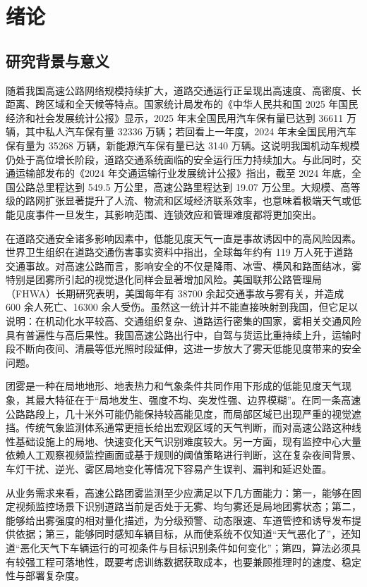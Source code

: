 \chapter{绪论}

\section{研究背景与意义}

随着我国高速公路网络规模持续扩大，道路交通运行正呈现出高速度、高密度、长距离、跨区域和全天候等特点。国家统计局发布的《中华人民共和国 2025 年国民经济和社会发展统计公报》显示，2025 年末全国民用汽车保有量已达到 36611 万辆，其中私人汽车保有量 32336 万辆；若回看上一年度，2024 年末全国民用汽车保有量为 35268 万辆，新能源汽车保有量已达 3140 万辆\cite{stat2025,stat2024}。这说明我国机动车规模仍处于高位增长阶段，道路交通系统面临的安全运行压力持续加大。与此同时，交通运输部发布的《2024 年交通运输行业发展统计公报》指出，截至 2024 年底，全国公路总里程达到 549.5 万公里，高速公路里程达到 19.07 万公里\cite{mot2024report}。大规模、高等级的路网扩张显著提升了人流、物流和区域经济联系效率，也意味着极端天气或低能见度事件一旦发生，其影响范围、连锁效应和管理难度都将更加突出。

在道路交通安全诸多影响因素中，低能见度天气一直是事故诱因中的高风险因素。世界卫生组织在道路交通伤害事实资料中指出，全球每年约有 119 万人死于道路交通事故。对高速公路而言，影响安全的不仅是降雨、冰雪、横风和路面结冰，雾特别是团雾所引起的视觉退化同样会显著增加风险。美国联邦公路管理局（FHWA）长期研究表明，美国每年有 38700 余起交通事故与雾有关，并造成 600 余人死亡、16300 余人受伤\cite{whoRoadInjury,fhwaWeatherImpact,aaafogreport2026}。虽然这一统计并不能直接映射到我国，但它足以说明：在机动化水平较高、交通组织复杂、道路运行密集的国家，雾相关交通风险具有普遍性与高后果性。我国高速公路出行中，自驾与货运比重持续上升，运输时段不断向夜间、清晨等低光照时段延伸，这进一步放大了雾天低能见度带来的安全问题。

团雾是一种在局地地形、地表热力和气象条件共同作用下形成的低能见度天气现象，其最大特征在于“局地发生、强度不均、突发性强、边界模糊”。在同一条高速公路路段上，几十米外可能仍能保持较高能见度，而局部区域已出现严重的视觉遮挡。传统气象监测体系通常更擅长给出宏观区域的天气判断，而对高速公路这种线性基础设施上的局地、快速变化天气识别难度较大。另一方面，现有监控中心大量依赖人工观察视频监控画面或基于规则的阈值策略进行判断，这在复杂夜间背景、车灯干扰、逆光、雾区局地变化等情况下容易产生误判、漏判和延迟处置\cite{qx8082025,sunxiao2024,chinaRoadWeatherReview}。

从业务需求来看，高速公路团雾监测至少应满足以下几方面能力：第一，能够在固定视频监控场景下识别道路当前是否处于无雾、均匀雾还是局地团雾状态；第二，能够给出雾强度的相对量化描述，为分级预警、动态限速、车道管控和诱导发布提供依据；第三，能够同时感知车辆目标，从而使系统不仅知道“天气恶化了”，还知道“恶化天气下车辆运行的可视条件与目标识别条件如何变化”；第四，算法必须具有较强工程可落地性，既要考虑训练数据获取成本，也要兼顾推理时的速度、稳定性与部署复杂度\cite{qx7292024,qx8082025,sunxiao2024}。

